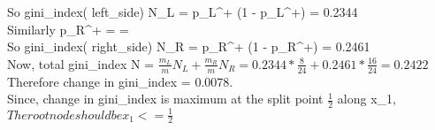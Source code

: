 \documentclass[twoside,10pt,a4paper]{article}
\theoremstyle{definition}
\theoremstyle{definition}
\theoremstyle{remark}
\renewcommand{\>}{{\rightarrow}}
\newcommand{\1}{{\mathbf 1}}
\newcommand{\0}{{\mathbf 0}}
\begin{document}
So
gini\_index( left\_side) N_L = p_L^+ (1 - p_L^+) = 0.2344\\

Similarly
p_R^+ =  =  \\

So
gini\_index( right\_side) N_R = p_R^+ (1 - p_R^+) = 0.2461\\

Now, total gini\_index N = $\frac{ m_L }{ m } N_L + \frac{m_R}{m} N_R = 0.2344 * \frac{8}{24} + 0.2461 * \frac{16}{24} = 0.2422$\\

Therefore change in gini\_index = 0.0078.\\

Since, change in gini\_index is maximum at the split point $\frac{1}{2}$ along x_1,\\
$The root node should be x_1 <= \frac{1}{2}$\\


\pagebreak
\end{document}
